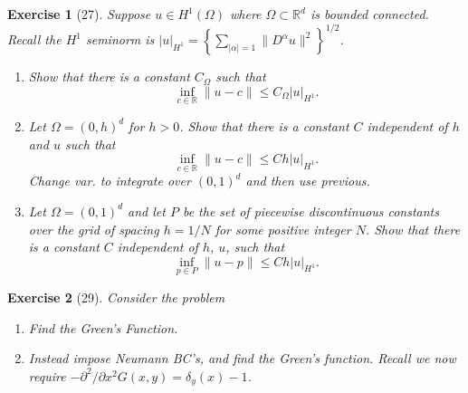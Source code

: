 \documentclass[letterpaper,twoside,11pt]{article}
\theoremstyle{mystyle}
\newtheorem*{exercise}{Exercise}
\newcommand{\R}{{\mathbb R}}
\begin{document}
\begin{exercise}[27]
  Suppose $u \in H^1\left( \Omega \right)$ where $\Omega\subset \R^d$ is bounded connected. Recall the $H^1$ seminorm is $|u|_{H^1} = \left\{ \sum_{|\alpha| = 1} \|D^\alpha u \|^2 \right\}^{1/2}$. 
  \begin{enumerate}
    \item Show that there is a constant $C_\Omega$ such that 
    \[\inf_{c\in \R} \|u-c\| \leq C_\Omega |u|_{H^1}.\]
    \item Let $\Omega = \left( 0, h \right)^d$ for $h > 0$. Show that there is a constant $C$ independent of $h$ and $u$ such that 
    \[\inf_{c\in \R} \|u-c\| \leq Ch |u|_{H^1}.\]
    Change var. to integrate over $(0,1)^d$ and then use previous. 
    \item Let $\Omega = \left( 0,1 \right)^d$ and let $P$ be the set of piecewise discontinuous constants over the grid of spacing $h = 1/N$ for some positive integer $N$. Show that there is a constant $C$ independent of $h$, $u$, such that 
    \[\inf_{p\in P} \|u-p\| \leq Ch |u|_{H^1}.\]
  \end{enumerate}
\end{exercise}

\begin{exercise}[29]
  Consider the problem 

  \begin{enumerate}
    \item Find the Green's Function. 
    \item Instead impose Neumann BC's, and find the Green's function. Recall we now require $-\partial^2/\partial x^2 G(x, y) = \delta_y(x) -1$.
  \end{enumerate}
\end{exercise}
\end{document}
